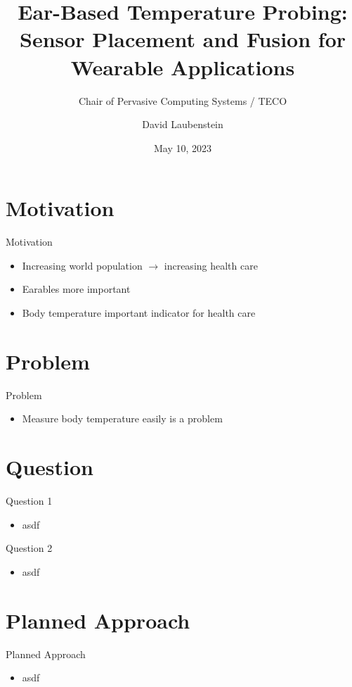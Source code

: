 \documentclass[en]{sdqbeamer}
\title[Ear-Based Temperature Probing]{Ear-Based Temperature Probing: \\ Sensor Placement and Fusion for Wearable Applications}
\subtitle{Chair of Pervasive Computing Systems / TECO}
\author[David Laubenstein]{David Laubenstein}
\date[05/10/2023]{May 10, 2023}
\begin{document}
 
\KITtitleframe


\section{Motivation}
\begin{frame}{Motivation}
    \begin{itemize}
        \item Increasing world population $\rightarrow$ increasing health care
        \item Earables more important
        \item Body temperature important indicator for health care
    \end{itemize}
\end{frame}

\section{Problem}
\begin{frame}{Problem}
    \begin{itemize}
        \item Measure body temperature easily is a problem
    \end{itemize}
\end{frame}

\section{Question}
\begin{frame}{Question 1}
    \begin{itemize}
        \item asdf
    \end{itemize}
\end{frame}

\begin{frame}{Question 2}
    \begin{itemize}
        \item asdf
    \end{itemize}
\end{frame}

\section{Planned Approach}
\begin{frame}{Planned Approach}
    \begin{itemize}
        \item asdf
    \end{itemize}
\end{frame}
\end{document}
